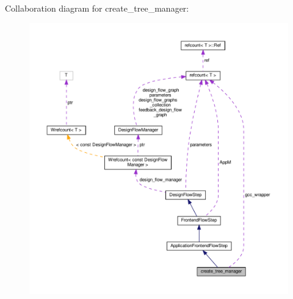 Collaboration diagram for create\+\_\+tree\+\_\+manager\+:
\nopagebreak
\begin{figure}[H]
\begin{center}
\leavevmode
\includegraphics[width=350pt]{da/d52/classcreate__tree__manager__coll__graph}
\end{center}
\end{figure}
